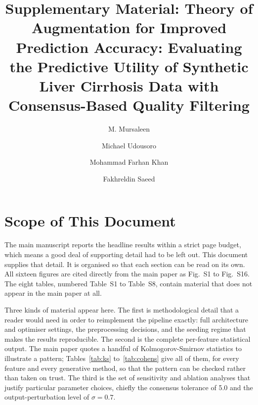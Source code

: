 \documentclass[manuscript,review,screen,nonacm]{acmart}
\begin{document}
\title[Supplementary Material]{Supplementary Material: Theory of Augmentation for Improved Prediction Accuracy: Evaluating the Predictive Utility of Synthetic Liver Cirrhosis Data with Consensus-Based Quality Filtering}
\author{M. Mursaleen}
\author{Michael Udousoro}
\author{Mohammad Farhan Khan}
\author{Fakhreldin Saeed}
\renewcommand{\shortauthors}{Mursaleen et al.}

\maketitle
\section{Scope of This Document}

The main manuscript reports the headline results within a strict page budget, which means a good deal of supporting detail had to be left out. This document supplies that detail. It is organised so that each section can be read on its own. All sixteen figures are cited directly from the main paper as Fig.~S1 to Fig.~S16. The eight tables, numbered Table~S1 to Table~S8, contain material that does not appear in the main paper at all.

Three kinds of material appear here. The first is methodological detail that a reader would need in order to reimplement the pipeline exactly: full architecture and optimiser settings, the preprocessing decisions, and the seeding regime that makes the results reproducible. The second is the complete per-feature statistical output. The main paper quotes a handful of Kolmogorov-Smirnov statistics to illustrate a pattern; Tables~\ref{tab:ks} to~\ref{tab:cohens} give all of them, for every feature and every generative method, so that the pattern can be checked rather than taken on trust. The third is the set of sensitivity and ablation analyses that justify particular parameter choices, chiefly the consensus tolerance of 5.0 and the output-perturbation level of $\sigma = 0.7$.
\end{document}
